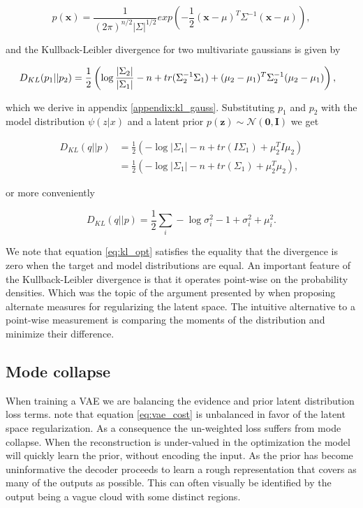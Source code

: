 \begin{equation}
p(\mathbf{x}) = \frac{1}{(2\pi)^{n/2}|\Sigma|^{1/2}}exp(-\frac{1}{2}(\mathbf{x} - \mathbb{\mu})^T\Sigma^{-1}(\mathbf{x}-\mu)),
\end{equation}

\noindent and the Kullback-Leibler divergence for two multivariate gaussians is given by 


\begin{equation}
\hspace*{-0.1in}
D_{KL}(p_1|| p_2 ) = \frac{1}{2} \left( \log \frac{|\Sigma_2|}{|\Sigma_1|} -n + tr(\Sigma^{-1}_2 \Sigma_1) + (\mu_2 - \mu_1)^T\Sigma_2^{-1}(\mu_2 - \mu_1) \right),
\end{equation}

\noindent which we derive in appendix \ref{appendix:kl_gauss}. Substituting $p_1$ and $p_2$ with the model distribution $\psi(z|x)$ and a latent prior $p(\mathbf{z}) \sim \mathcal{N}(\mathbf{0}, \mathbf{I})$ we get 

\begin{align*}
D_{KL}(q||p) &= \frac{1}{2} \left( - \log {|\Sigma_1|} -n + tr(I \Sigma_1) + \mu_2 ^TI\mu_2 \right) \\
&= \frac{1}{2} \left( - \log {|\Sigma_1|} -n + tr(\Sigma_1) + \mu_2 ^T\mu_2 \right),
\end{align*}

\noindent or more conveniently

\begin{equation}\label{eq:kl_opt}
D_{KL}(q||p) = \frac{1}{2} \sum_i -\log \sigma_i^2 - 1 + \sigma^2_i + \mu_i^2 .
\end{equation}


\noindent We note that equation \ref{eq:kl_opt} satisfies the equality that the divergence is zero when the target and model distributions are equal. An important feature of the Kullback-Leibler divergence is that it operates point-wise on the probability densities. Which was the topic of the argument presented by \citet{Zhao} when proposing alternate measures for regularizing the latent space. The intuitive alternative to a point-wise measurement is comparing the moments of the distribution and minimize their difference. 

\subsection{Mode collapse}

When training a VAE we are balancing the evidence and prior latent distribution loss terms. \citet{Kingma2013} note that equation \ref{eq:vae_cost} is unbalanced in favor of the latent space regularization. As a consequence the un-weighted loss suffers from mode collapse. When the reconstruction is under-valued in the optimization the model will quickly learn the prior, without encoding the input. As the prior has become uninformative the decoder proceeds to learn a rough representation that covers as many of the outputs as possible. This can often visually be identified by the output being a vague cloud with some distinct regions. 